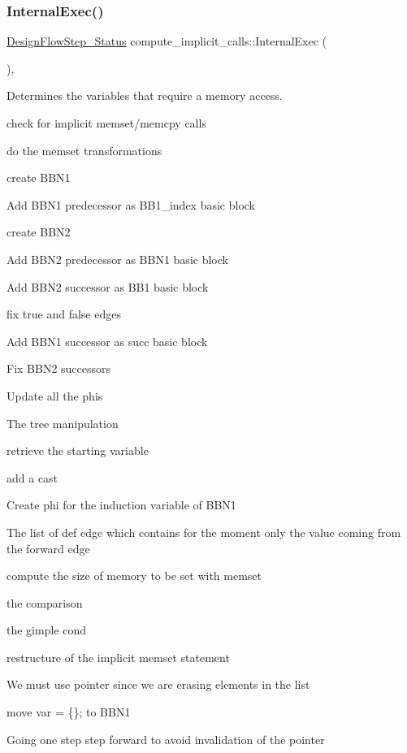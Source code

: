 \subsubsection{\texorpdfstring{Internal\+Exec()}{InternalExec()}}
{\footnotesize\ttfamily \hyperlink{design__flow__step_8hpp_afb1f0d73069c26076b8d31dbc8ebecdf}{Design\+Flow\+Step\+\_\+\+Status} compute\+\_\+implicit\+\_\+calls\+::\+Internal\+Exec (\begin{DoxyParamCaption}{ }\end{DoxyParamCaption})\hspace{0.3cm}{\ttfamily [override]}, {\ttfamily [virtual]}}



Determines the variables that require a memory access. 

check for implicit memset/memcpy calls

do the memset transformations

create B\+B\+N1

Add B\+B\+N1 predecessor as B\+B1\+\_\+index basic block

create B\+B\+N2

Add B\+B\+N2 predecessor as B\+B\+N1 basic block

Add B\+B\+N2 successor as B\+B1 basic block

fix true and false edges

Add B\+B\+N1 successor as succ basic block

Fix B\+B\+N2 successors

Update all the phis

The tree manipulation

retrieve the starting variable

add a cast

Create phi for the induction variable of B\+B\+N1

The list of def edge which contains for the moment only the value coming from the forward edge

compute the size of memory to be set with memset

the comparison

the gimple cond

restructure of the implicit memset statement

We must use pointer since we are erasing elements in the list

move var = \{\}; to B\+B\+N1

Going one step step forward to avoid invalidation of the pointer

